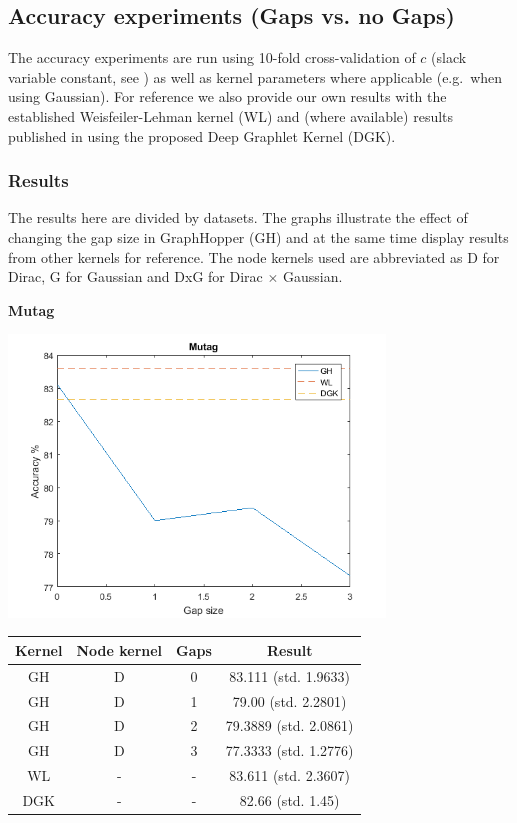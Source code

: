 \documentclass{article}
\begin{document}
\subsection{Accuracy experiments (Gaps vs. no Gaps)}
The accuracy experiments are run using 10-fold cross-validation of $c$ (slack variable constant, see \cite{svm-graph-kernels}) as well as kernel parameters where applicable (e.g.\ when using Gaussian). For reference we also provide our own results with the established Weisfeiler-Lehman kernel\cite{WL} (WL) and (where available) results published in \cite{yarnardag} using the proposed Deep Graphlet Kernel (DGK).

\subsubsection{Results}
The results here are divided by datasets. The graphs illustrate the effect of changing the gap size in GraphHopper (GH) and at the same time display results from other kernels for reference. The node kernels used are abbreviated as D for Dirac, G for Gaussian and DxG for Dirac $\times$ Gaussian.

\textbf{Mutag}\\
\begin{minipage}{0.6\linewidth}
		\hspace*{-1in}
		\includegraphics[width=10cm]{mutag}
		\label{fig:mutag}
\end{minipage}
\begin{minipage}[c]{0.5\linewidth}
	
	\centering
	\begin{tabular}{c|c|c|c}
			Kernel & Node kernel & Gaps &  Result\\
			\hline
			GH & D & 0 & 83.111 (std. 1.9633)\\
			GH & D & 1 & 79.00 (std. 2.2801)\\
			GH & D & 2 & 79.3889 (std. 2.0861)\\
			GH & D & 3 &  77.3333 (std. 1.2776)\\
			WL & - & - & 83.611 (std. 2.3607)\\
			DGK & - & - & 82.66 (std. 1.45)
		\end{tabular}
	\label{table:mutag}
\end{minipage}
\end{document}
